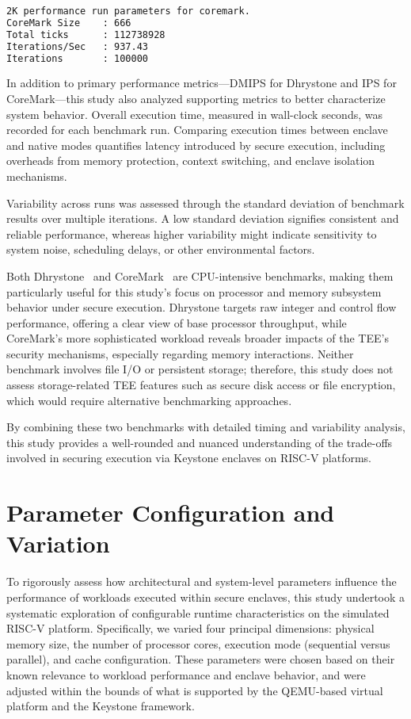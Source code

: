 \begin{lstlisting}[language=bash, caption={CoreMark sample output used to extract IPS}, label={lst:coremark-output}]
2K performance run parameters for coremark.
CoreMark Size    : 666
Total ticks      : 112738928
Iterations/Sec   : 937.43
Iterations       : 100000
\end{lstlisting}

In addition to primary performance metrics—DMIPS for Dhrystone and IPS for CoreMark—this study also analyzed supporting metrics to better characterize system behavior. Overall execution time, measured in wall-clock seconds, was recorded for each benchmark run. Comparing execution times between enclave and native modes quantifies latency introduced by secure execution, including overheads from memory protection, context switching, and enclave isolation mechanisms.

Variability across runs was assessed through the standard deviation of benchmark results over multiple iterations. A low standard deviation signifies consistent and reliable performance, whereas higher variability might indicate sensitivity to system noise, scheduling delays, or other environmental factors.

Both Dhrystone~\cite{weiss2002dhrystone} and CoreMark~\cite{gal2012exploring} are CPU-intensive benchmarks, making them particularly useful for this study’s focus on processor and memory subsystem behavior under secure execution. Dhrystone targets raw integer and control flow performance, offering a clear view of base processor throughput, while CoreMark’s more sophisticated workload reveals broader impacts of the TEE’s security mechanisms, especially regarding memory interactions. Neither benchmark involves file I/O or persistent storage; therefore, this study does not assess storage-related TEE features such as secure disk access or file encryption, which would require alternative benchmarking approaches.

By combining these two benchmarks with detailed timing and variability analysis, this study provides a well-rounded and nuanced understanding of the trade-offs involved in securing execution via Keystone enclaves on RISC-V platforms.

\section{Parameter Configuration and Variation}
\label{sec:param-variation}

To rigorously assess how architectural and system-level parameters influence the performance of workloads executed within secure enclaves, this study undertook a systematic exploration of configurable runtime characteristics on the simulated RISC-V platform. Specifically, we varied four principal dimensions: physical memory size, the number of processor cores, execution mode (sequential versus parallel), and cache configuration. These parameters were chosen based on their known relevance to workload performance and enclave behavior, and were adjusted within the bounds of what is supported by the QEMU-based virtual platform and the Keystone framework.

